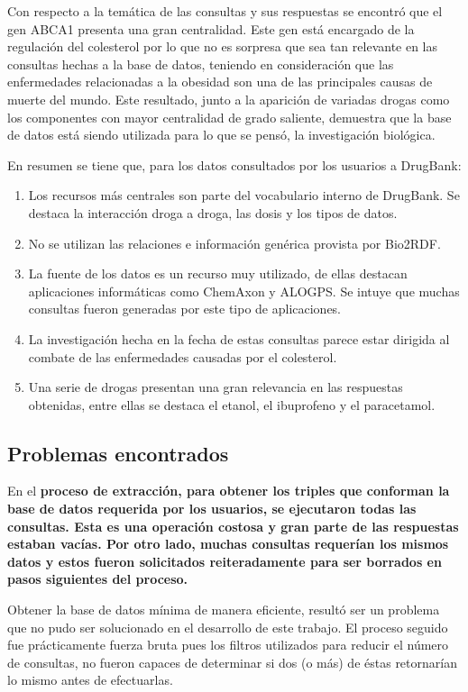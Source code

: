 Con respecto a la temática de las consultas y sus respuestas se encontró que el
gen ABCA1 presenta una gran centralidad. Este gen está encargado de la
regulación del colesterol por lo que no es sorpresa que sea tan relevante en las
consultas hechas a la base de datos, teniendo en consideración que las
enfermedades relacionadas a la obesidad son una de las principales causas de
muerte del mundo.
Este resultado, junto a la aparición de variadas drogas como los componentes con
mayor centralidad de grado saliente, demuestra que la base de datos está siendo
utilizada para lo que se pensó, la investigación biológica.

En resumen se tiene que, para los datos consultados por los usuarios a
DrugBank:
\begin{enumerate}
  \item
    Los recursos más centrales son parte del vocabulario interno de DrugBank.
    Se destaca la interacción droga a droga, las dosis y los tipos de datos.
  \item
    No se utilizan las relaciones e información genérica provista por Bio2RDF.
  \item
    La fuente de los datos es un recurso muy utilizado, de ellas destacan
    aplicaciones informáticas como ChemAxon  y ALOGPS. Se intuye que muchas
    consultas fueron generadas por este tipo de aplicaciones.
  \item
    La investigación hecha en la fecha de estas consultas parece estar dirigida
    al combate de las enfermedades causadas por el colesterol.
  \item
    Una serie de drogas presentan una gran relevancia en las respuestas
    obtenidas, entre ellas se destaca el etanol, el ibuprofeno y el paracetamol.
\end{enumerate}

\subsection{Problemas encontrados}\label{sec:con:pr}
En el \bf{proceso de extracción}, para obtener los triples que conforman la base
de datos requerida por los usuarios, se ejecutaron todas las consultas.
Esta es una operación costosa y gran parte de las respuestas estaban vacías.
Por otro lado, muchas consultas requerían los mismos datos y estos fueron
solicitados reiteradamente para ser borrados en pasos siguientes del proceso.

Obtener la base de datos mínima de manera eficiente, resultó ser un problema que
no pudo ser solucionado en el desarrollo de este trabajo.
El proceso seguido fue prácticamente fuerza bruta pues los filtros utilizados
para reducir el número de consultas, no fueron capaces de determinar si dos (o
más) de éstas retornarían lo mismo antes de efectuarlas.

